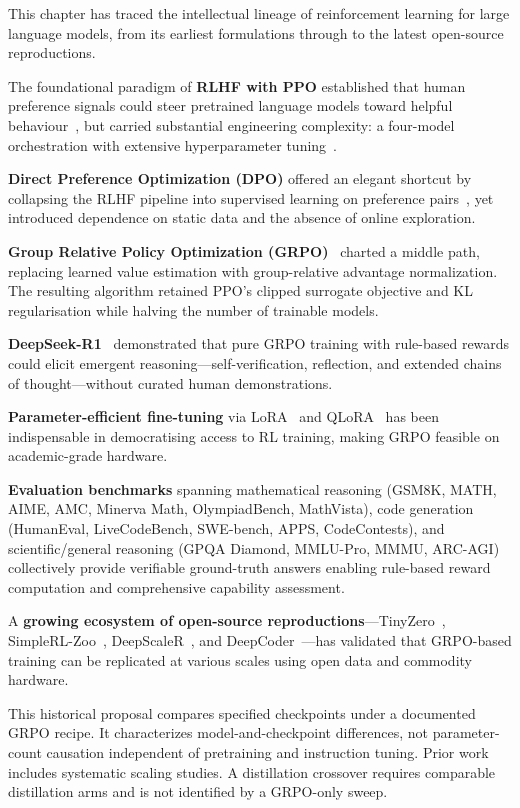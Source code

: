 \documentclass[12pt,a4paper]{report}
\begin{document}
This chapter has traced the intellectual lineage of reinforcement learning for large language models, from its earliest formulations through to the latest open-source reproductions.

The foundational paradigm of \textbf{RLHF with PPO} established that human preference signals could steer pretrained language models toward helpful behaviour~\cite{ouyang2022instructgpt}, but carried substantial engineering complexity: a four-model orchestration with extensive hyperparameter tuning~\cite{schulman2017ppo, zheng2023secrets}.

\textbf{Direct Preference Optimization (DPO)} offered an elegant shortcut by collapsing the RLHF pipeline into supervised learning on preference pairs~\cite{rafailov2023dpo}, yet introduced dependence on static data and the absence of online exploration.

\textbf{Group Relative Policy Optimization (GRPO)}~\cite{shao2024deepseekmath} charted a middle path, replacing learned value estimation with group-relative advantage normalization. The resulting algorithm retained PPO's clipped surrogate objective and KL regularisation while halving the number of trainable models.

\textbf{DeepSeek-R1}~\cite{deepseek2025r1} demonstrated that pure GRPO training with rule-based rewards could elicit emergent reasoning---self-verification, reflection, and extended chains of thought---without curated human demonstrations.

\textbf{Parameter-efficient fine-tuning} via LoRA~\cite{hu2021lora} and QLoRA~\cite{dettmers2023qlora} has been indispensable in democratising access to RL training, making GRPO feasible on academic-grade hardware.

\textbf{Evaluation benchmarks} spanning mathematical reasoning (GSM8K, MATH, AIME, AMC, Minerva Math, OlympiadBench, MathVista), code generation (HumanEval, LiveCodeBench, SWE-bench, APPS, CodeContests), and scientific/general reasoning (GPQA Diamond, MMLU-Pro, MMMU, ARC-AGI) collectively provide verifiable ground-truth answers enabling rule-based reward computation and comprehensive capability assessment.

A \textbf{growing ecosystem of open-source reproductions}---TinyZero~\cite{wen2025tinyzero}, SimpleRL-Zoo~\cite{zeng2025simplerl}, DeepScaleR~\cite{luo2025deepscaler}, and DeepCoder~\cite{xu2025deepcoder}---has validated that GRPO-based training can be replicated at various scales using open data and commodity hardware.

This historical proposal compares specified checkpoints under a documented GRPO recipe. It characterizes model-and-checkpoint differences, not parameter-count causation independent of pretraining and instruction tuning. Prior work includes systematic scaling studies. A distillation crossover requires comparable distillation arms and is not identified by a GRPO-only sweep.



\end{document}
